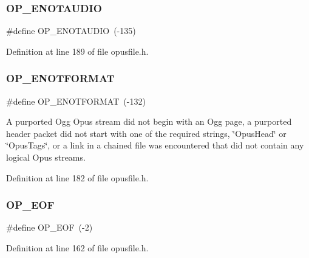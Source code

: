 \mbox{\label{group__error__codes_ga3a2a6cb4837030d240f326e17dda3c0e}} 
\subsubsection{\texorpdfstring{OP\_ENOTAUDIO}{OP\_ENOTAUDIO}}
{\footnotesize\ttfamily \#define O\+P\+\_\+\+E\+N\+O\+T\+A\+U\+D\+IO~(-\/135)}



Definition at line 189 of file opusfile.\+h.

\mbox{\label{group__error__codes_gafca3ae244d24e10b2851c77379453220}} 
\subsubsection{\texorpdfstring{OP\_ENOTFORMAT}{OP\_ENOTFORMAT}}
{\footnotesize\ttfamily \#define O\+P\+\_\+\+E\+N\+O\+T\+F\+O\+R\+M\+AT~(-\/132)}

A purported Ogg Opus stream did not begin with an Ogg page, a purported header packet did not start with one of the required strings, \char`\"{}\+Opus\+Head\char`\"{} or \char`\"{}\+Opus\+Tags\char`\"{}, or a link in a chained file was encountered that did not contain any logical Opus streams. 

Definition at line 182 of file opusfile.\+h.

\mbox{\label{group__error__codes_ga3fdffc8ee880969d99fc862d53c0efd2}} 
\subsubsection{\texorpdfstring{OP\_EOF}{OP\_EOF}}
{\footnotesize\ttfamily \#define O\+P\+\_\+\+E\+OF~(-\/2)}



Definition at line 162 of file opusfile.\+h.

\mbox{\label{group__error__codes_ga3ad48a4f99b1bed72acec552296dfc08}} 
